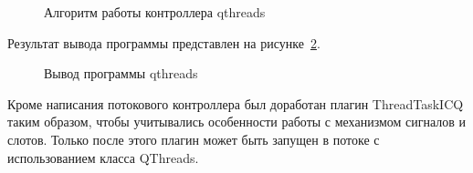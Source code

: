 \clearpage

\begin{figure}[ht]
\caption{ Алгоритм работы контроллера qthreads }
\label{controller-qthreads:controller-qthreads}
\end{figure}

\clearpage

Результат вывода программы представлен на рисунке~\ref{program-output:program-output}.

\begin{figure}[h!]
\caption{ Вывод программы qthreads }
\label{program-output:program-output}
\end{figure}

Кроме написания потокового контроллера был доработан плагин ThreadTaskICQ таким образом, чтобы учитывались особенности работы с механизмом сигналов и слотов. Только после этого плагин может быть запущен в потоке с использованием класса QThreads.  

\clearpage
